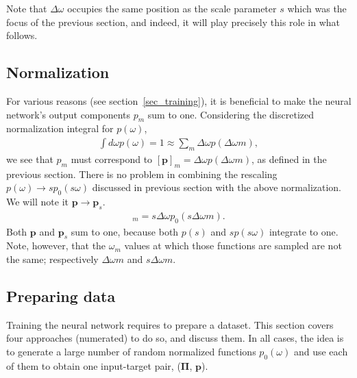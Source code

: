 \documentclass[notitlepage,11pt,nofootinbib]{revtex4-1}
\renewcommand{\vec}[1]{\bm{#1}}
\begin{document}
Note that $\Delta\omega$ occupies the same position as the scale parameter $s$ which was the focus of the previous section, and indeed, it will play precisely this role in what follows.

\subsection{Normalization}
\label{sec_normalization}
For various reasons (see section~\ref{sec_training}), it is beneficial to make the neural network's output components $p_m$ sum to one. Considering the discretized normalization integral for $p(\omega)$,
\begin{align}
\int d\omega p(\omega) = 1 \approx \sum_m \Delta\omega p(\Delta\omega m),
\end{align}
we see that $p_m$ must correspond to $[\vec p]_m = \Delta\omega p(\Delta\omega m)$, as defined in the previous section.
There is no problem in combining the rescaling $p(\omega)\rightarrow sp_0(s\omega)$ discussed in previous section with the above normalization. We will note it $\vec p \rightarrow \vec p_s$.
\begin{align}
    [\vec p_s]_m = s\Delta\omega p_0(s\Delta\omega m).
\end{align}
Both $\vec p$ and $\vec p_s$ sum to one, because both $p(s)$ and $sp(s\omega)$ integrate to one. Note, however, that the $\omega_m$ values at which those functions are sampled are not the same; respectively $\Delta\omega m$ and $s\Delta\omega m$.


\subsection{Preparing data}

Training the neural network requires to prepare a dataset. This section covers four approaches (numerated) to do so, and discuss them. In all cases, the idea is to generate a large number of random normalized functions $p_0(\omega)$ and use each of them to obtain one input-target pair, ($\vec \Pi$, $\vec p$).
\end{document}

